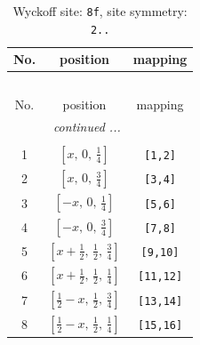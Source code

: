 \documentclass[fleqn,8pt]{jsarticle}
\begin{document}
\begin{longtable}{ccc}
\caption{Wyckoff site: {\tt 8f}, site symmetry: {\tt 2..}}
 \\
 \hline \hline
No. & position & mapping \\ \hline \endfirsthead

\multicolumn{2}{l}{\tablename\ \thetable{}} \\
 \hline \hline
No. & position & mapping \\ \hline \endhead

 \hline \hline
\multicolumn{2}{r}{\footnotesize\it continued ...} \\ \endfoot

 \hline \hline
\multicolumn{2}{r}{} \\ \endlastfoot

1 & $\left[ x,\, 0,\, \frac{1}{4} \right]$ & {\tt [1,2]} \\ \hline
2 & $\left[ x,\, 0,\, \frac{3}{4} \right]$ & {\tt [3,4]} \\ \hline
3 & $\left[ - x,\, 0,\, \frac{1}{4} \right]$ & {\tt [5,6]} \\ \hline
4 & $\left[ - x,\, 0,\, \frac{3}{4} \right]$ & {\tt [7,8]} \\ \hline
5 & $\left[ x + \frac{1}{2},\, \frac{1}{2},\, \frac{3}{4} \right]$ & {\tt [9,10]} \\ \hline
6 & $\left[ x + \frac{1}{2},\, \frac{1}{2},\, \frac{1}{4} \right]$ & {\tt [11,12]} \\ \hline
7 & $\left[ \frac{1}{2} - x,\, \frac{1}{2},\, \frac{3}{4} \right]$ & {\tt [13,14]} \\ \hline
8 & $\left[ \frac{1}{2} - x,\, \frac{1}{2},\, \frac{1}{4} \right]$ & {\tt [15,16]} \\
\end{longtable}
\renewcommand{\arraystretch}{1.2}
\end{document}

